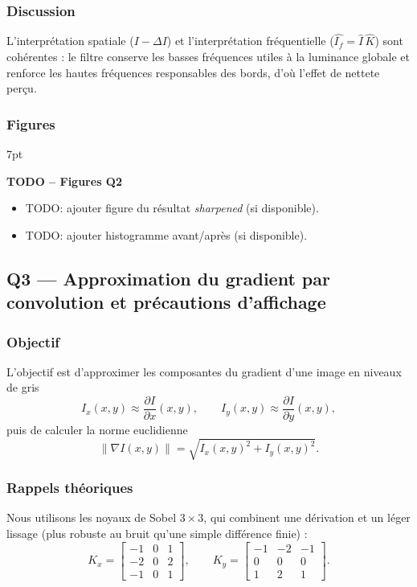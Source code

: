 \documentclass[11pt,a4paper]{article}
\newenvironment{formal}{%
\def\FrameCommand{%
  \hspace{1pt}%
  {\color{enstaBleuFonce}\vrule width 2pt}%
  {\color{formalshade}\vrule width 4pt}%
  \colorbox{formalshade}%
}%
\MakeFramed{\advance\hsize-\width\FrameRestore}%
\noindent\hspace{-4.55pt}%
\begin{adjustwidth}{}{7pt}%
\vspace{4pt}%
}{%
\vspace{4pt}\end{adjustwidth}\endMakeFramed%
}
\begin{document}
\subsubsection{Discussion}
L'interpr\'etation spatiale (\(I-\Delta I\)) et l'interpr\'etation fr\'equentielle (\(\widehat{I_f}=\widehat{I}\,\widehat{K}\)) sont coh\'erentes : le filtre conserve les basses fr\'equences utiles \`a la luminance globale et renforce les hautes fr\'equences responsables des bords, d'o\`u l'effet de nettete per\c cu.

\subsubsection{Figures}
\begin{formal}
\textbf{TODO -- Figures Q2}
\begin{itemize}[leftmargin=1.5em]
  \item TODO: ajouter figure du r\'esultat \textit{sharpened} (si disponible).
  \item TODO: ajouter histogramme avant/apr\`es (si disponible).
\end{itemize}
\end{formal}

\subsection{Q3 --- Approximation du gradient par convolution et pr\'ecautions d'affichage}
\label{sec:q3_gradients}

\subsubsection{Objectif}
L'objectif est d'approximer les composantes du gradient d'une image en niveaux de gris
\[
I_x(x,y) \approx \frac{\partial I}{\partial x}(x,y), 
\qquad
I_y(x,y) \approx \frac{\partial I}{\partial y}(x,y),
\]
puis de calculer la norme euclidienne
\[
\|\nabla I(x,y)\| = \sqrt{I_x(x,y)^2 + I_y(x,y)^2}.
\]

\subsubsection{Rappels théoriques}
Nous utilisons les noyaux de Sobel \(3\times3\), qui combinent une d\'erivation et un l\'eger lissage (plus robuste au bruit qu'une simple diff\'erence finie) :
\[
K_x=
\begin{bmatrix}
-1 & 0 & 1\\
-2 & 0 & 2\\
-1 & 0 & 1
\end{bmatrix},
\qquad
K_y=
\begin{bmatrix}
-1 & -2 & -1\\
0 & 0 & 0\\
1 & 2 & 1
\end{bmatrix}.
\]
\end{document}
